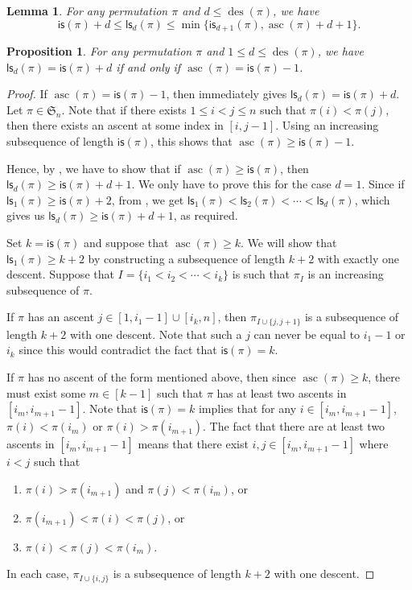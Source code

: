 \documentclass[10pt,a4paper]{amsart}
\newtheorem{lemma}{Lemma}
\newtheorem{proposition}{Proposition}
\newcommand{\asc}{\operatorname{asc}}
\newcommand{\des}{\operatorname{des}}
\newcommand{\is}{\mathsf{is}}
\newcommand{\ls}{\mathsf{ls}}
\newcommand{\s}{\mathfrak{S}}
\begin{document}
\begin{lemma}\label{lsdbound}
    For any permutation $\pi$ and $d \leq \des(\pi)$, we have
    \begin{equation*}
        \is(\pi) + d \leq \ls_d(\pi) \leq \operatorname{min}\{\is_{d + 1}(\pi), \asc(\pi) + d + 1\}.
    \end{equation*}
\end{lemma}

\begin{proposition}\label{gs=isplus1}
    For any permutation $\pi$ and $1 \leq d \leq \des(\pi)$, we have $\ls_d(\pi) = \is(\pi) + d$ if and only if $\asc(\pi) = \is(\pi) - 1$.
\end{proposition}

\begin{proof}
    If $\asc(\pi) = \is(\pi) - 1$, then  immediately gives $\ls_d(\pi) = \is(\pi) + d$. 
    Let $\pi \in \s_n$. 
    Note that if there exists $1 \leq i < j \leq n$ such that $\pi(i) < \pi(j)$, then there exists an ascent at some index in $[i, j - 1]$. 
    Using an increasing subsequence of length $\is(\pi)$, this shows that $\asc(\pi) \geq \is(\pi) - 1$.
    
    Hence, by , we have to show that if $\asc(\pi) \geq \is(\pi)$, then $\ls_d(\pi) \geq \is(\pi) + d + 1$. 
    We only have to prove this for the case $d = 1$. 
    Since if $\ls_1(\pi) \geq \is(\pi) + 2$, from , we get $\ls_1(\pi) < \ls_2(\pi) < \cdots < \ls_d(\pi)$, which gives us $\ls_d(\pi) \geq \is(\pi) + d + 1$, as required.

    Set $k = \is(\pi)$ and suppose that $\asc(\pi) \geq k$. 
    We will show that $\ls_1(\pi) \geq k + 2$ by constructing a subsequence of length $k + 2$ with exactly one descent. 
    Suppose that $I = \{i_1 < i_2 < \cdots < i_k\}$ is such that $\pi_I$ is an increasing subsequence of $\pi$.

    If $\pi$ has an ascent $j \in [1, i_1 - 1] \cup [i_k, n]$, then $\pi_{I \cup \{j, j + 1\}}$ is a subsequence of length $k + 2$ with one descent. 
    Note that such a $j$ can never be equal to $i_1 - 1$ or $i_k$ since this would contradict the fact that $\is(\pi) = k$.

    If $\pi$ has no ascent of the form mentioned above, then since $\asc(\pi) \geq k$, there must exist some $m \in [k - 1]$ such that $\pi$ has at least two ascents in $[i_m, i_{m + 1} - 1]$. 
    Note that $\is(\pi) = k$ implies that for any $i \in [i_m, i_{m + 1} - 1]$, $\pi(i) < \pi(i_m)$ or $\pi(i) > \pi(i_{m + 1})$. 
    The fact that there are at least two ascents in $[i_m, i_{m + 1} - 1]$ means that there exist $i, j \in [i_m, i_{m + 1} - 1]$ where $i < j$ such that
    \begin{enumerate}
        \item $\pi(i) > \pi(i_{m + 1})$ and $\pi(j) < \pi(i_m)$, or
        \item $\pi(i_{m + 1}) < \pi(i)< \pi(j)$, or
        \item $\pi(i) < \pi(j) < \pi(i_m)$.
    \end{enumerate}
    In each case, $\pi_{I \cup \{i, j\}}$ is a subsequence of length $k + 2$ with one descent.
\end{proof}
\end{document}
